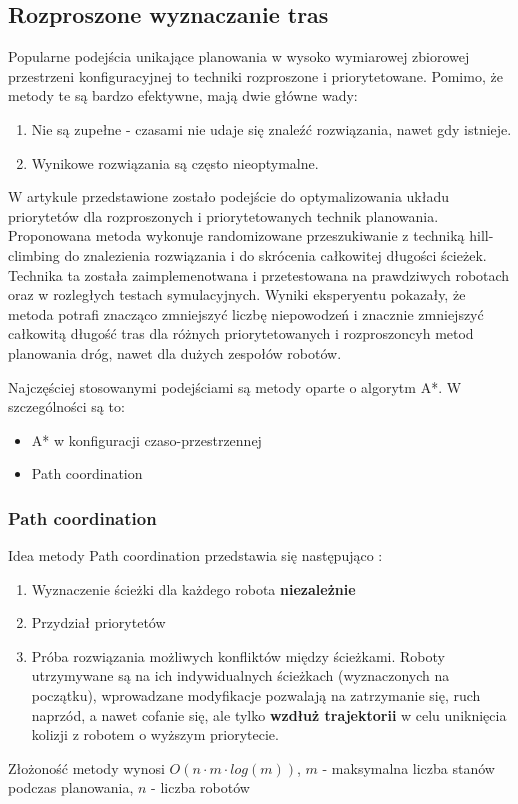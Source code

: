 \subsection{Rozproszone wyznaczanie tras}
Popularne podejścia unikające planowania w wysoko wymiarowej zbiorowej przestrzeni konfiguracyjnej to techniki rozproszone i priorytetowane.
Pomimo, że metody te są bardzo efektywne, mają dwie główne wady:
\begin{enumerate}
	\item Nie są zupełne - czasami nie udaje się znaleźć rozwiązania, nawet gdy istnieje.
	\item Wynikowe rozwiązania są często nieoptymalne.
\end{enumerate}

W artykule \cite{optpriorities} przedstawione zostało podejście do optymalizowania układu priorytetów dla rozproszonych i priorytetowanych technik planowania.
Proponowana metoda wykonuje randomizowane przeszukiwanie z techniką hill-climbing do znalezienia rozwiązania i do skrócenia całkowitej długości ścieżek.
Technika ta została zaimplemenotwana i przetestowana na prawdziwych robotach oraz w rozległych testach symulacyjnych.
Wyniki eksperyentu pokazały, że metoda potrafi znacząco zmniejszyć liczbę niepowodzeń i znacznie zmniejszyć całkowitą długość tras dla różnych priorytetowanych i rozproszoncyh metod planowania dróg, nawet dla dużych zespołów robotów.

Najczęściej stosowanymi podejściami są metody oparte o algorytm A*. W szczególności są to:
\begin{itemize}
	\item A* w konfiguracji czaso-przestrzennej
	\item Path coordination
\end{itemize}

\subsubsection{Path coordination}
Idea metody Path coordination przedstawia się następująco \cite{optpriorities}:
\begin{enumerate}
	\item Wyznaczenie ścieżki dla każdego robota {\bf niezależnie}
	\item Przydział priorytetów
	\item Próba rozwiązania możliwych konfliktów między ścieżkami. Roboty utrzymywane są na ich indywidualnych ścieżkach (wyznaczonych na początku), wprowadzane modyfikacje pozwalają na zatrzymanie się, ruch naprzód, a nawet cofanie się, ale tylko {\bf wzdłuż trajektorii} w celu uniknięcia kolizji z robotem o wyższym priorytecie.
\end{enumerate}
Złożoność metody wynosi $O(n \cdot m \cdot log(m))$, $m$ - maksymalna liczba stanów podczas planowania, $n$ - liczba robotów

